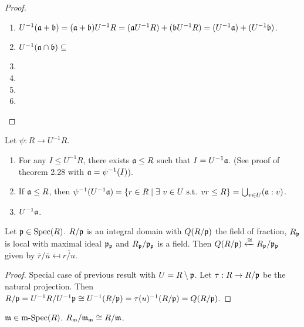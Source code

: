 \begin{proof}
    \begin{enumerate}
        \item $U^{-1}(\mathfrak{a}+\mathfrak{b}) = (\mathfrak{a}+\mathfrak{b})U^{-1}R = (\mathfrak{a} U^{-1}R) + (\mathfrak{b} U^{-1}R) = (U^{-1}\mathfrak{a}) + (U^{-1}\mathfrak{b})$.
        \item $U^{-1}(\mathfrak{a} \cap \mathfrak{b}) \subseteq$
        \item 
        \item 
        \item 
        \item 
    \end{enumerate}
\end{proof}

\begin{proposition}
    Let $\psi: R \to U^{-1}R$.
    \begin{enumerate}
        \item For any $I \leq U^{-1}R$, there exists $\mathfrak{a} \leq R$ such that $I = U^{-1}\mathfrak{a}$. (See proof of theorem 2.28 with $\mathfrak{a} = \psi^{-1}(I)$).
        \item If $\mathfrak{a} \leq R$, then $\psi^{-1}(U^{-1}\mathfrak{a}) =\{r \in R \mid \exists \  v \in U \text{ s.t. }v r \leq R\} = \bigcup_{v \in U} (\mathfrak{a}:v)$.
        \item $U^{-1}\mathfrak{a}$.
    \end{enumerate}
\end{proposition}

\begin{proposition}
\end{proposition}

\begin{corollary}
    Let $\mathfrak{p} \in \operatorname{Spec}(R)$. $R/\mathfrak{p}$ is an integral domain with $Q(R/\mathfrak{p})$ the field of fraction, $R_{\mathfrak{p}}$ is local with maximal ideal $\mathfrak{p}_{\mathfrak{p}}$ and $R_{\mathfrak{p}}/\mathfrak{p}_{\mathfrak{p}}$ is a field. Then $Q(R/\mathfrak{p}) \xleftarrow \cong R_{\mathfrak{p}}/\mathfrak{p}_{\mathfrak{p}}$ given by $\overbar r / \overbar u \mapsfrom \overbar {r/u}$.
\end{corollary}

\begin{proof}
    Special case of previous result with $U = R \setminus \mathfrak{p}$. Let $\tau: R \to R/\mathfrak{p}$ be the natural projection. Then $R/\mathfrak{p} = U^{-1}R/U^{-1}\mathfrak{p} \cong U^{-1}(R/\mathfrak{p}) = \tau(u)^{-1}(R/\mathfrak{p}) = Q(R/\mathfrak{p})$.
\end{proof}

\begin{corollary}
    $\mathfrak{m} \in \operatorname{m-Spec}(R)$. $R_{\mathfrak{m}}/\mathfrak{m}_{\mathfrak{m}} \cong R/\mathfrak{m}$.
\end{corollary}


